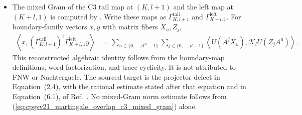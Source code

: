 \documentclass{article}
\providecommand{\Fin}[1]{\{0,\ldots,#1{-}1\}}
\begin{document}
\begin{itemize}
          The theorem
          chooses $p>0$, measured in input-tensor sites, such that $A$ is
          $p$-block injective and the defect with $L=Q=p$ is at most $7/16$ for
          every $K$. Its specialization
          takes $K=p$. Thus the prefix-uniform estimate and the three-block
          coefficient $7/16$ are proved in original-site units.

    \item The mixed Gram of the C3 tail map at $(K,l+1)$ and the left map at
          $(K+l,1)$ is computed by
          .
          Write these maps as $\Gamma^{\mathrm{tail}}_{K,l+1}$ and
          $\Gamma^{\mathrm{left}}_{K+l,1}$. For boundary-family vectors $x,y$ with
          matrix fibers $X_u,Z_j$,
          \begin{align}
              \left\langle
              x,
              (\Gamma^{\mathrm{tail}}_{K,l+1})^\dagger
              \Gamma^{\mathrm{left}}_{K+l,1}y
              \right\rangle
               & =
              \sum_{u\in\Fin{d^K}}\sum_{j\in\Fin{d}}
              \left\langle
              U(A^jX_u),\mathcal K_lU(Z_jA^u)
              \right\rangle.
              \label{eq:cpgsv21_martingale_overlap_c3_mixed_gram}
          \end{align}
          This reconstructed algebraic identity follows from the boundary-map
          definitions, word factorization, and trace cyclicity. It is not attributed
          to FNW or Nachtergaele. The sourced target is the projector defect in
          Equation~(2.4), with the rational estimate stated after that equation and
          in Equation~(6.1), of
          Ref.~\cite{Nachtergaele1996Spectral}. No mixed-Gram norm estimate follows
          from (\ref{eq:cpgsv21_martingale_overlap_c3_mixed_gram}) alone.


\end{itemize}
\end{document}
